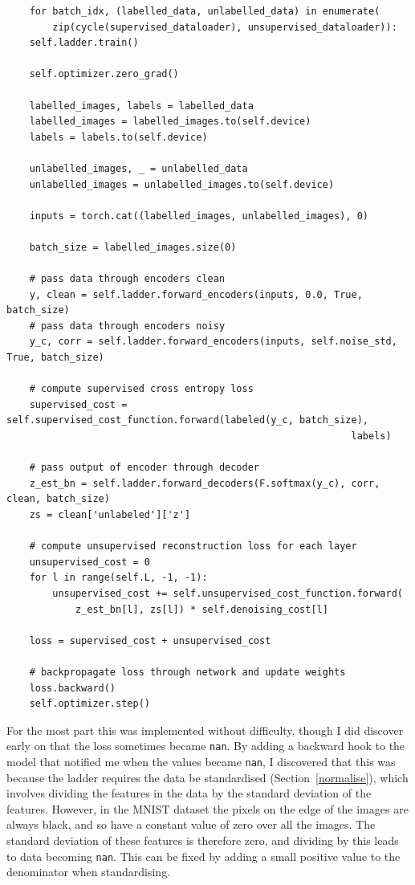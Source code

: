 {\renewcommand{\baselinestretch}{0.8}\small
    \begin{verbatim}
    for batch_idx, (labelled_data, unlabelled_data) in enumerate(
        zip(cycle(supervised_dataloader), unsupervised_dataloader)):
    self.ladder.train()

    self.optimizer.zero_grad()

    labelled_images, labels = labelled_data
    labelled_images = labelled_images.to(self.device)
    labels = labels.to(self.device)

    unlabelled_images, _ = unlabelled_data
    unlabelled_images = unlabelled_images.to(self.device)

    inputs = torch.cat((labelled_images, unlabelled_images), 0)

    batch_size = labelled_images.size(0)
    
    # pass data through encoders clean
    y, clean = self.ladder.forward_encoders(inputs, 0.0, True, batch_size)
    # pass data through encoders noisy
    y_c, corr = self.ladder.forward_encoders(inputs, self.noise_std, True, batch_size)

    # compute supervised cross entropy loss
    supervised_cost = self.supervised_cost_function.forward(labeled(y_c, batch_size), 
                                                            labels)
    
    # pass output of encoder through decoder
    z_est_bn = self.ladder.forward_decoders(F.softmax(y_c), corr, clean, batch_size)
    zs = clean['unlabeled']['z']
    
    # compute unsupervised reconstruction loss for each layer
    unsupervised_cost = 0
    for l in range(self.L, -1, -1):
        unsupervised_cost += self.unsupervised_cost_function.forward(
            z_est_bn[l], zs[l]) * self.denoising_cost[l]
     
    loss = supervised_cost + unsupervised_cost
    
    # backpropagate loss through network and update weights
    loss.backward()
    self.optimizer.step()
    \end{verbatim}
}

For the most part this was implemented without difficulty, though I did discover early on that the loss sometimes became \texttt{nan}.
By adding a backward hook to the model that notified me when the values became \texttt{nan}, I discovered that this was because 
the ladder requires the data be standardised (Section~\ref{normalise}), which involves dividing the features in the data by the standard deviation of the 
features. However, in the MNIST dataset the pixels on the edge of the images are always black, and so have a constant value of zero over 
all the images. The standard deviation of these features is therefore zero, and dividing by this leads to data becoming \texttt{nan}.
This can be fixed by adding a small positive value to the denominator when standardising.

